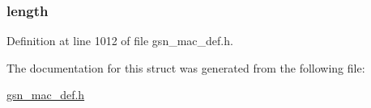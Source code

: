 \hypertarget{a00113_ae360fb41f422c7c83b87d9af070cbd31}{
\subsubsection[{length}]{ {\bf length}}}
\label{a00113_ae360fb41f422c7c83b87d9af070cbd31}


Definition at line 1012 of file gsn\_\-mac\_\-def.h.



The documentation for this struct was generated from the following file:\begin{DoxyCompactItemize}
\item 
\hyperlink{a00522}{gsn\_\-mac\_\-def.h}\end{DoxyCompactItemize}
